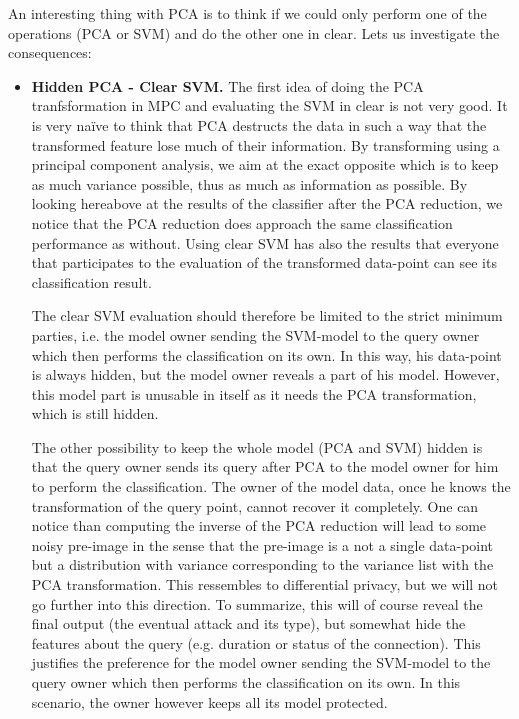 An interesting thing with PCA is to think if we could only perform one of the operations (PCA or SVM) and do the other one in clear. Lets us investigate the consequences:
\begin{itemize}
    \item \textbf{Hidden PCA - Clear SVM.} The first idea of doing the PCA tranfsformation in MPC and evaluating the SVM in clear is not very good. It is very naïve to think that PCA destructs the data in such a way that the transformed feature lose much of their information. By transforming using a principal component analysis, we aim at the exact opposite which is to keep as much variance possible, thus as much as information as possible. By looking hereabove at the results of the classifier after the PCA reduction, we notice that the PCA reduction does approach the same classification performance as without. Using clear SVM has also the results that everyone that participates to the evaluation of the transformed data-point can see its classification result. 
    
    The clear SVM evaluation should therefore be limited to the strict minimum parties, i.e. the model owner sending the SVM-model to the query owner which then performs the classification on its own. In this way, his data-point is always hidden, but the model owner reveals a part of his model. However, this model part is unusable in itself as it needs the PCA transformation, which is still hidden.

    The other possibility to keep the whole model (PCA and SVM) hidden is that the query owner sends its query after PCA to the model owner for him to perform the classification. The owner of the model data, once he knows the transformation of the query point, cannot recover it completely. One can notice than computing the inverse of the PCA reduction will lead to some noisy pre-image in the sense that the pre-image is a not a single data-point but a distribution with variance corresponding to the variance list with the PCA transformation. This ressembles to differential privacy, but we will not go further into this direction. To summarize, this will of course reveal the final output (the eventual attack and its type), but somewhat hide the features about the query (e.g. duration or status of the connection). This justifies the preference for the model owner sending the SVM-model to the query owner which then performs the classification on its own. In this scenario, the owner however keeps all its model protected.
    

\end{itemize}
